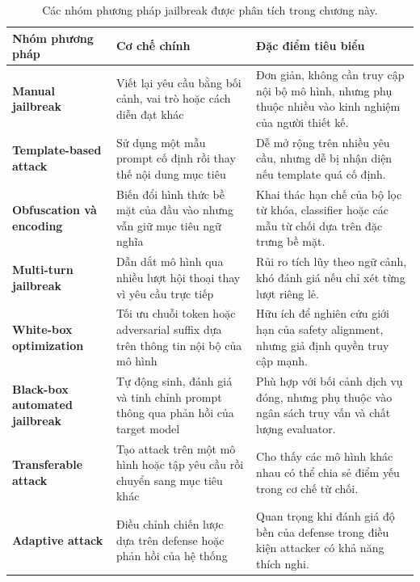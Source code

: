 \begin{table}[H]
\centering
\caption{Các nhóm phương pháp jailbreak được phân tích trong chương này.}
\label{tab:jailbreak-method-families}
\begin{tabularx}{\textwidth}{
    >{\bfseries}p{}
    p{}
    X
}
\toprule
Nhóm phương pháp
& Cơ chế chính
& Đặc điểm tiêu biểu \\
\midrule

Manual jailbreak
& Viết lại yêu cầu bằng bối cảnh, vai trò hoặc cách diễn đạt khác
& Đơn giản, không cần truy cập nội bộ mô hình, nhưng phụ thuộc nhiều vào
kinh nghiệm của người thiết kế. \\

Template-based attack
& Sử dụng một mẫu prompt cố định rồi thay thế nội dung mục tiêu
& Dễ mở rộng trên nhiều yêu cầu, nhưng dễ bị nhận diện nếu template quá
cố định. \\

Obfuscation và encoding
& Biến đổi hình thức bề mặt của đầu vào nhưng vẫn giữ mục tiêu ngữ nghĩa
& Khai thác hạn chế của bộ lọc từ khóa, classifier hoặc các mẫu từ chối
dựa trên đặc trưng bề mặt. \\

Multi-turn jailbreak
& Dẫn dắt mô hình qua nhiều lượt hội thoại thay vì yêu cầu trực tiếp
& Rủi ro tích lũy theo ngữ cảnh, khó đánh giá nếu chỉ xét từng lượt riêng
lẻ. \\

White-box optimization
& Tối ưu chuỗi token hoặc adversarial suffix dựa trên thông tin nội bộ
của mô hình
& Hữu ích để nghiên cứu giới hạn của safety alignment, nhưng giả định
quyền truy cập mạnh. \\

Black-box automated jailbreak
& Tự động sinh, đánh giá và tinh chỉnh prompt thông qua phản hồi của
target model
& Phù hợp với bối cảnh dịch vụ đóng, nhưng phụ thuộc vào ngân sách truy
vấn và chất lượng evaluator. \\

Transferable attack
& Tạo attack trên một mô hình hoặc tập yêu cầu rồi chuyển sang mục tiêu
khác
& Cho thấy các mô hình khác nhau có thể chia sẻ điểm yếu trong cơ chế
từ chối. \\

Adaptive attack
& Điều chỉnh chiến lược dựa trên defense hoặc phản hồi của hệ thống
& Quan trọng khi đánh giá độ bền của defense trong điều kiện attacker có
khả năng thích nghi. \\

\bottomrule
\end{tabularx}
\end{table}

